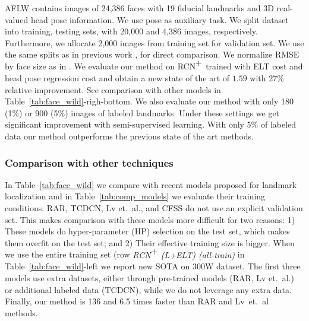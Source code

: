 \documentclass[10pt,twocolumn,letterpaper]{article}
\begin{document}
AFLW \cite{AFLW_2011} contains images of 24,386 faces with 19 fiducial landmarks and 3D real-valued head pose information. We use pose as auxiliary task.
We split dataset into training,  testing sets, with 20,000 and 4,386 images, respectively. Furthermore, we allocate 2,000 images from training set for validation set. We use the same splits as in previous work \cite{ren2014face}, \cite{Lv_2017_CVPR} for direct comparison. We normalize RMSE by face size as in \cite{Lv_2017_CVPR}. 
We evaluate our method on RCN$\stackanchor{+}{}$ trained with ELT cost and head pose regression cost and obtain a new state of the art of $1.59$ with 27\% relative improvement. See comparison with other models in Table~\ref{tab:face_wild}-righ-bottom. We also evaluate our method with only 180 (1\%) or 900 (5\%) images of labeled landmarks. Under these settings we get significant improvement  with semi-supervised learning. With only 5\% of labeled data our method outperforms the previous state of the art methods.\subsubsection{Comparison with other techniques}\label{sec:exp_comparison}\vskip-5pt
In Table~\ref{tab:face_wild} we compare with recent models proposed for landmark localization and in Table~\ref{tab:comp_models} we evaluate their training conditions. RAR, TCDCN, Lv et.~al., and CFSS do not use an explicit validation set. This makes comparison with these models more difficult for two reasons: 1) These models do hyper-parameter (HP) selection on the test set, which makes them overfit on the test set; and 2) Their effective training size is bigger. When we use the entire training set (row \emph{RCN$\stackanchor{+}{}$ (L+ELT) (all-train)} in Table~\ref{tab:face_wild}-left we report new SOTA on 300W dataset. The first three models use extra datasets, either through pre-trained models (RAR, Lv et.~al.) or additional labeled data (TCDCN), while we do not leverage any extra data. 
Finally, our method is 136 and 6.5 times faster than RAR and Lv~et.~al methods.
\vskip-30pt
\end{document}
